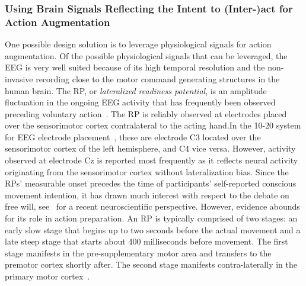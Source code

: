 \subsubsection{Using Brain Signals Reflecting the Intent to (Inter-)act for Action Augmentation}
One possible design solution is to leverage physiological signals for action augmentation. Of the possible physiological signals that can be leveraged, the EEG is very well suited because of its high temporal resolution and the non-invasive recording close to the motor command generating structures in the human brain. The RP, or \textit{lateralized readiness potential}, is an amplitude fluctuation in the ongoing EEG activity that has frequently been observed preceding voluntary action~\cite{Deecke1969-bl, Libet1983-qu}. The RP is reliably observed at electrodes placed over the sensorimotor cortex contralateral to the acting hand.In the 10-20 system for EEG electrode placement~\cite{Jasper1983-uw}, these are electrode C3 located over the sensorimotor cortex of the left hemisphere, and C4 vice versa. However, activity observed at electrode Cz is reported most frequently as it reflects neural activity originating from the sensorimotor cortex without lateralization bias. Since the RPs' measurable onset precedes the time of participants' self-reported conscious movement intention, it has drawn much interest with respect to the debate on free will, see~\cite{Schurger2021-vp} for a recent neuroscientific perspective. However, evidence abounds for its role in action preparation. An RP is typically comprised of two stages: an early slow stage that begins up to two seconds before the actual movement and a late steep stage that starts about 400 milliseconds before movement. The first stage manifests in the pre-supplementary motor area and transfers to the premotor cortex shortly after. The second stage manifests contra-laterally in the primary motor cortex~\cite{Shibasaki2006-mt}. 

